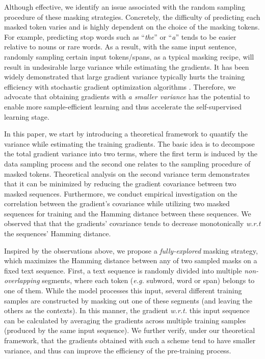 \documentclass{article} \usepackage{iclr2021_conference,times}
\theoremstyle{plain}
\begin{document}
Although effective, we identify an issue associated with the random sampling procedure of these masking strategies. 
Concretely, the difficulty of predicting each masked token varies and is highly dependent on the choice of the masking tokens. For example, predicting stop words such as ``\emph{the}'' or ``\emph{a}'' tends to be easier relative to nouns or rare words. As a result, with the same input sentence, randomly sampling certain input tokens/spans, as a typical masking recipe, will result in undesirable large variance while estimating the gradients. 
It has been widely demonstrated that large gradient variance typically hurts the training efficiency with stochastic gradient optimization algorithms \citep{zhang2019stochastic, xiao2014proximal, johnson2013accelerating}.
Therefore, we advocate that obtaining gradients with \emph{a smaller variance} has the potential to enable more sample-efficient learning and thus accelerate the self-supervised learning stage. 


In this paper, we start by introducing a theoretical framework to quantify the variance while estimating the training gradients. The basic idea is to decompose the total gradient variance into two terms, where the first term is induced by the data sampling process and the second one relates to the sampling procedure of masked tokens. Theoretical analysis on the second variance term demonstrates that it can be minimized by reducing the gradient covariance between two masked sequences.
Furthermore, we conduct empirical investigation on the correlation between the gradient's covariance while utilizing two masked sequences for training and the Hamming distance between these sequences. We observed that that the gradients' covariance tends to decrease monotonically \emph{w.r.t} the sequences' Hamming distance.   


Inspired by the observations above, we propose a \emph{fully-explored} masking strategy, which maximizes the Hamming distance between any of two sampled masks on a fixed text sequence. First, a text sequence is randomly divided into multiple \emph{non-overlapping} segments, where each token (\emph{e.g.} subword, word or span) belongs to one of them. 
While the model processes this input, several different training samples are constructed by masking out one of these segments (and leaving the others as the contexts). In this manner, the gradient \emph{w.r.t.} this input sequence can be calculated by averaging the gradients across multiple training samples (produced by the same input sequence). 
We further verify, under our theoretical framework, that the gradients obtained with such a scheme tend to have smaller variance, and thus can improve the efficiency of the pre-training process. 
\end{document}
